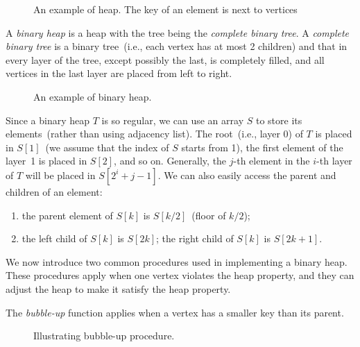 \begin{figure}[h!]
\centering{}
\caption{An example of heap. The key of an element is next to vertices}
\end{figure}

A \emph{binary heap} is a heap with the tree being the \emph{complete binary tree}.
A \emph{complete binary tree} is a binary tree~(i.e., each vertex has at most 2 children)
and that in every layer of the tree, except possibly the last, is completely filled, and all vertices in the last layer are placed from left to right.

\begin{figure}[h!]
\centering{}
\caption{An example of binary heap.}
\end{figure}

Since a binary heap $T$ is so regular, we can use an array $S$ to store its elements~(rather than using adjacency list).
The root~(i.e., layer 0) of $T$ is placed in $S[1]$~(we assume that the index of $S$ starts from 1),
the first element of the layer~1 is placed in $S[2]$, and so on.
Generally, the $j$-th element in the $i$-th layer of $T$ will be placed in $S[2^i + j - 1]$.
We can also easily access the parent and children of an element:
\vspace*{-\topsep}
\begin{enumerate}
\item the parent element of $S[k]$ is $S[k/2]$~(floor of $k/2$);
\item the left child of $S[k]$ is $S[2k]$; the right child of $S[k]$ is $S[2k + 1]$.
\end{enumerate}

We now introduce two common procedures used in implementing a binary heap.
These procedures apply when one vertex violates the heap property,
and they can adjust the heap to make it satisfy the heap property.

The \emph{bubble-up} function applies when a vertex has a smaller key than its parent.

\begin{minipage}{0.8\textwidth}
	\xxx
	\xxx
	\xxx
	\xxx
	\xxx
	\xxx
	\xxx
\end{minipage}

\begin{figure}[h!]
\centering{}
\caption{Illustrating bubble-up procedure.}
\end{figure}


